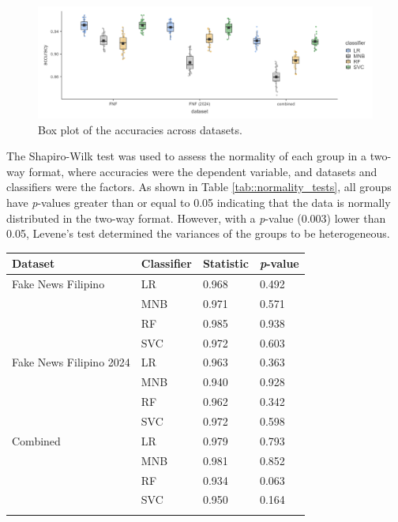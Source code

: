 \begin{figure}[h!]
    \centering
    \includegraphics[width=\textwidth,height=\textheight, keepaspectratio]{figures/stats/box_plot.png}
        \caption{Box plot of the accuracies across datasets.}
        \label{fig:box_plot_accuracy}
\end{figure}

The Shapiro-Wilk test was used to assess the normality of each group in a two-way format, where accuracies were the dependent variable, and datasets and classifiers were the factors. As shown in Table \ref{tab::normality_tests}, all groups have \textit{p}-values greater than or equal to 0.05 indicating that the data is normally distributed in the two-way format. However, with a \textit{p}-value (0.003) lower than 0.05, Levene's test determined the variances of the groups to be heterogeneous.

\singlespacing
\begin{tabularx}{\textwidth}{|l|l|l|l|}
    \hline
    Dataset & Classifier & Statistic & \textit{p}-value \\
    \hline
    Fake News Filipino & LR & 0.968 & 0.492 \\
    \cline{2-4}
    & MNB & 0.971 & 0.571 \\
    \cline{2-4}
    & RF & 0.985 & 0.938 \\
    \cline{2-4}
    & SVC & 0.972 & 0.603 \\
    \hline
    Fake News Filipino 2024 & LR & 0.963 & 0.363 \\
    \cline{2-4}
    & MNB & 0.940 & 0.928 \\
    \cline{2-4}
    & RF & 0.962 & 0.342 \\
    \cline{2-4}
    & SVC & 0.972 & 0.598 \\
    \hline
    Combined & LR & 0.979 & 0.793 \\
    \cline{2-4}
    & MNB & 0.981 & 0.852 \\
    \cline{2-4}
    & RF & 0.934 & 0.063 \\
    \cline{2-4}
    & SVC & 0.950 & 0.164 \\
    \hline
\caption{Shapiro-Wilk normality test in a two-way format.}
\label{tab::normality_tests}
\end{tabularx}
\doublespacing

